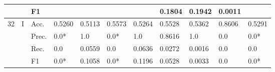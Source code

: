 \begin{tabular}{cclllllllll}
    \multicolumn{1}{l}{}                                                                                       &                                   & F1                                                   &                         &                         &                              &                         & 0.1804                                                                       & 0.1942                                                                      & 0.0011                                    &                                           \\ 
    \midrule
    \multirow{12}{*}{32}                                                                                       & \multirow{4}{*}{I}                & Acc.                                                 & 0.5260                  & 0.5113                  & 0.5573                       & 0.5264                  & 0.5528                                                                       & 0.5362                                                                      & 0.8606                                    & 0.5291                                    \\
                                                                                                               &                                   & Prec.                                                & 0.0*                    & 1.0                     & 0.0*                         & 1.0                     & 0.8616                                                                       & 1.0                                                                         & 0.0                                       & 0.0*                                      \\
                                                                                                               &                                   & Rec.                                                 & 0.0                     & 0.0559                  & 0.0                          & 0.0636                  & 0.0272                                                                       & 0.0016                                                                      & 0.0                                       & 0.0                                       \\
                                                                                                               &                                   & F1                                                   & 0.0*                    & 0.1058                  & 0.0*                         & 0.1196                  & 0.0528                                                                       & 0.0033                                                                      & 0.0                                       & 0.0*                                      \\ 

\end{tabular}
